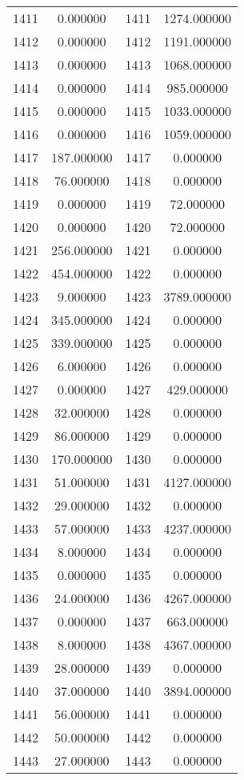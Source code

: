 \documentclass[12pt]{article}
\begin{document}
\begin{longtable}{@{}cccc@{}}
1411 & 0.000000 & 1411 & 1274.000000 \\
1412 & 0.000000 & 1412 & 1191.000000 \\
1413 & 0.000000 & 1413 & 1068.000000 \\
1414 & 0.000000 & 1414 & 985.000000 \\
1415 & 0.000000 & 1415 & 1033.000000 \\
1416 & 0.000000 & 1416 & 1059.000000 \\
1417 & 187.000000 & 1417 & 0.000000 \\
1418 & 76.000000 & 1418 & 0.000000 \\
1419 & 0.000000 & 1419 & 72.000000 \\
1420 & 0.000000 & 1420 & 72.000000 \\
1421 & 256.000000 & 1421 & 0.000000 \\
1422 & 454.000000 & 1422 & 0.000000 \\
1423 & 9.000000 & 1423 & 3789.000000 \\
1424 & 345.000000 & 1424 & 0.000000 \\
1425 & 339.000000 & 1425 & 0.000000 \\
1426 & 6.000000 & 1426 & 0.000000 \\
1427 & 0.000000 & 1427 & 429.000000 \\
1428 & 32.000000 & 1428 & 0.000000 \\
1429 & 86.000000 & 1429 & 0.000000 \\
1430 & 170.000000 & 1430 & 0.000000 \\
1431 & 51.000000 & 1431 & 4127.000000 \\
1432 & 29.000000 & 1432 & 0.000000 \\
1433 & 57.000000 & 1433 & 4237.000000 \\
1434 & 8.000000 & 1434 & 0.000000 \\
1435 & 0.000000 & 1435 & 0.000000 \\
1436 & 24.000000 & 1436 & 4267.000000 \\
1437 & 0.000000 & 1437 & 663.000000 \\
1438 & 8.000000 & 1438 & 4367.000000 \\
1439 & 28.000000 & 1439 & 0.000000 \\
1440 & 37.000000 & 1440 & 3894.000000 \\
1441 & 56.000000 & 1441 & 0.000000 \\
1442 & 50.000000 & 1442 & 0.000000 \\
1443 & 27.000000 & 1443 & 0.000000 \\

\end{longtable}
\end{document}
